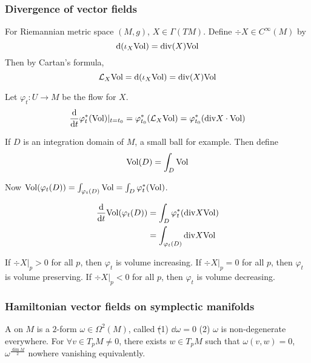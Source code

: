 \subsubsection{Divergence of vector fields}
\begin{definition}
    For Riemannian metric space  $ (M,g) $,  $ X\in \Gamma(TM) $. Define  $ \div X\in C^\infty(M)$ by 
    \begin{equation}
        \mathrm{d}(\iota_X \mathrm{Vol})=\mathrm{div}(X)\mathrm{Vol}\label{eq:def of divergence}
    \end{equation}
    Then by Cartan's formula, 
    \begin{equation}\label{eq:Lie derivative of volume form}
        \mathcal{L}_X\mathrm{Vol}=\mathrm{d}(\iota_X\mathrm{Vol})=\mathrm{div}(X)\mathrm{Vol}
    \end{equation}
\end{definition}
Let  $ \varphi_t:U\rightarrow M $ be the flow for  $ X $.
\begin{equation}
    \frac{\mathrm{d} }{\mathrm{d} t}\varphi_t^*(\mathrm{Vol})|_{t=t_0}=\varphi_{t_0}^*(\mathcal{L}_X\mathrm{Vol})=\varphi_{t_0}^*(\mathrm{div} X\cdot \mathrm{Vol})
\end{equation}  

If  $ D  $ is an integration domain of  $ M $,  a small ball for example. Then define 
\begin{equation}
    \name{$ \Vol(D) $}=\int_D\Vol
\end{equation}

Now  $ \mathrm{Vol}(\varphi_t(D))=\int_{\varphi_t(D)}\mathrm{Vol}=\int_D\varphi_t^*(\mathrm{Vol}) $.

\begin{equation}
    \begin{aligned}
        \frac{\mathrm{d} }{\mathrm{d} t}\mathrm{Vol}(\varphi_t(D))&=\int_D\varphi_t^*(\mathrm{div} X\mathrm{Vol})\\
        &=\int_{\varphi_t(D)}\mathrm{div} X\mathrm{Vol}
    \end{aligned}
\end{equation}

If  $ \div X|_p>0 $ for all  $ p $, then  $ \varphi_t $ is volume increasing. If  $ \div X|_p=0 $ for all  $ p $, then  $ \varphi_t $ is volume preserving. If  $ \div X|_p<0 $ for all  $ p  $, then  $ \varphi_t  $ is volume decreasing. 

\subsubsection{Hamiltonian vector fields on symplectic manifolds}
A  on  $ M  $  is a  $ 2 $-form  $ \omega\in \Omega^2(M) $, called  \st (1)  $ \dd\omega=0 $ (2) $ \omega  $ is non-degenerate everywhere. \ie For  $ \forall v\in T_pM\neq 0 $, there exists  $ w\in T_pM $ such that  $ \omega(v,w)=0 $,  $ \omega^{\frac{\dim M}{2}} $ nowhere vanishing equivalently.   

